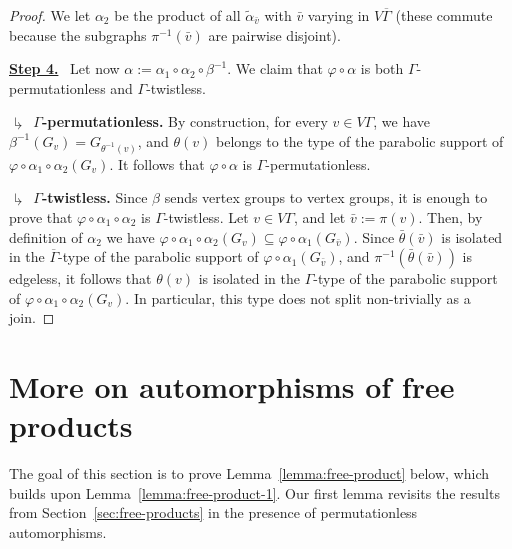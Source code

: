\documentclass[a4paper,english,11pt]{article}
\theoremstyle{definition}
\theoremstyle{remark}
\begin{document}
\begin{proof}
We let $\alpha_2$ be the product of all $\tilde\alpha_{\bar v}$ with $\bar v$ varying in $V\overline\Gamma$ (these commute because the subgraphs $\pi^{-1}(\bar v)$ are pairwise disjoint). 

\medskip

\underline{\textbf{Step 4.}}~ 
Let now $\alpha:=\alpha_1\circ\alpha_2\circ\beta^{-1}$. We claim that $\varphi\circ\alpha$ is both $\Gamma$-permutationless and $\Gamma$-twistless.

\textbf{$\drsh$ $\Gamma$-permutationless.} By construction, for every $v\in V\Gamma$, we have $\beta^{-1}(G_v)=G_{\theta^{-1}(v)}$, and $\theta(v)$ belongs to the type of the parabolic support of $\varphi\circ\alpha_1\circ\alpha_2(G_v)$. It follows that $\varphi\circ\alpha$ is $\Gamma$-permutationless.

\textbf{$\drsh$ $\Gamma$-twistless.} Since $\beta$ sends vertex groups to vertex groups, it is enough to prove that $\varphi\circ\alpha_1\circ\alpha_2$ is $\Gamma$-twistless. Let $v\in V\Gamma$, and let $\bar v:=\pi(v)$. Then, by definition of $\alpha_2$ we have $\varphi\circ\alpha_1\circ\alpha_2(G_v) \subseteq\varphi\circ\alpha_1(G_{\bar v})$. Since $\bar{\theta}(\bar v)$ is isolated in the $\overline\Gamma$-type of the parabolic support of $\varphi\circ\alpha_1(G_{\bar v})$, and $\pi^{-1}(\bar\theta(\bar v))$ is edgeless, it follows that $\theta(v)$ is isolated in the $\Gamma$-type of the parabolic support of $\varphi\circ\alpha_1\circ\alpha_2(G_v)$. In particular, this type does not split non-trivially as a join. 
\end{proof}

\section{More on automorphisms of free products}\label{sec:free-products-2}


The goal of this section is to prove Lemma~\ref{lemma:free-product} below, which builds upon Lemma~\ref{lemma:free-product-1}. Our first lemma revisits the results from Section~\ref{sec:free-products} in the presence of permutationless automorphisms.
\end{document}
